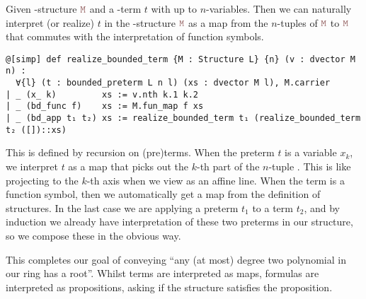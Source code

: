 \begin{dfn}
    Given -structure $\code{M}$ and a -term $t$ with up to $n$-variables.
    Then we can naturally interpret (or realize) $t$ in the -structure $\code{M}$ as a
    map from the $n$-tuples of $\code{M}$ to $\code{M}$ that
    commutes with the interpretation of function symbols.

    \begin{lstlisting}
@[simp] def realize_bounded_term {M : Structure L} {n} (v : dvector M n) :
  ∀{l} (t : bounded_preterm L n l) (xs : dvector M l), M.carrier
| _ (x_ k)         xs := v.nth k.1 k.2
| _ (bd_func f)    xs := M.fun_map f xs
| _ (bd_app t₁ t₂) xs := realize_bounded_term t₁ (realize_bounded_term t₂ ([])::xs) \end{lstlisting}

    This is defined by recursion on (pre)terms.
    When the preterm $t$ is a variable $x_{k}$, we interpret $t$ as a map
    that picks out the $k$-th part of the $n$-tuple .
    This is like projecting to the $k$-th axis when we view  as an affine line.
    When the term is a function symbol, then we automatically get a map from the
    definition of structures.
    In the last case we are applying a preterm $t_{1}$ to a term $t_{2}$,
    and by induction we already have interpretation of these two preterms
    in our structure, so we compose these in the obvious way.
\end{dfn}

This completes our goal of conveying
``any (at most) degree two polynomial in our ring has a root''.
Whilst terms are interpreted as maps, formulas are interpreted as propositions,
asking if the structure  satisfies the proposition.

